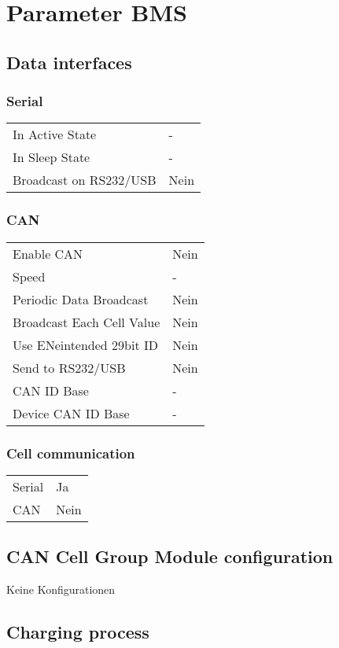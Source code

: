 \chapter{Parameter BMS}
\section*{Data interfaces}
\subsection*{Serial}
\begin{tabular}{p{11cm}p{2cm}}
	In Active State & - \\
	In Sleep State & - \\
	Broadcast on RS232/USB & Nein
\end{tabular}

\subsection*{CAN}
\begin{tabular}{p{11cm}p{2cm}}
	Enable CAN & Nein \\
	Speed & - \\
	Periodic Data Broadcast & Nein \\
	Broadcast Each Cell Value & Nein \\
	Use ENeintended 29bit ID & Nein \\
	Send to RS232/USB & Nein \\
	CAN ID Base & - \\
	Device CAN ID Base & -
\end{tabular}

\subsection*{Cell communication}
\begin{tabular}{p{11cm}p{2cm}}
	Serial & Ja \\
	CAN & Nein
\end{tabular}

\section*{CAN Cell Group Module configuration}
Keine Konfigurationen

\section*{Charging process}
